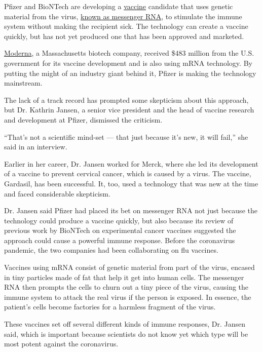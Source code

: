 Pfizer and BioNTech are developing a
\href{https://www.nytimes3xbfgragh.onion/2020/05/15/us/politics/coronavirus-vaccine-timeline.html}{vaccine}
candidate that uses genetic material from the virus,
\href{https://www.nytimes3xbfgragh.onion/2020/05/05/health/pfizer-vaccine-coronavirus.html}{known
as messenger RNA}, to stimulate the immune system without making the
recipient sick. The technology can create a vaccine quickly, but has not
yet produced one that has been approved and marketed.

\href{https://www.nytimes3xbfgragh.onion/2020/07/27/health/moderna-vaccine-covid.html}{Moderna},
a Massachusetts biotech company, received \$483 million from the U.S.
government for its vaccine development and is also using mRNA
technology. By putting the might of an industry giant behind it, Pfizer
is making the technology mainstream.

The lack of a track record has prompted some skepticism about this
approach, but Dr. Kathrin Jansen, a senior vice president and the head
of vaccine research and development at Pfizer, dismissed the criticism.

``That's not a scientific mind-set --- that just because it's new, it
will fail,'' she said in an interview.

Earlier in her career, Dr. Jansen worked for Merck, where she led its
development of a vaccine to prevent cervical cancer, which is caused by
a virus. The vaccine, Gardasil, has been successful. It, too, used a
technology that was new at the time and faced considerable skepticism.

Dr. Jansen said Pfizer had placed its bet on messenger RNA not just
because the technology could produce a vaccine quickly, but also because
its review of previous work by BioNTech on experimental cancer vaccines
suggested the approach could cause a powerful immune response. Before
the coronavirus pandemic, the two companies had been collaborating on
flu vaccines.

Vaccines using mRNA consist of genetic material from part of the virus,
encased in tiny particles made of fat that help it get into human cells.
The messenger RNA then prompts the cells to churn out a tiny piece of
the virus, causing the immune system to attack the real virus if the
person is exposed. In essence, the patient's cells become factories for
a harmless fragment of the virus.

These vaccines set off several different kinds of immune responses, Dr.
Jansen said, which is important because scientists do not know yet which
type will be most potent against the coronavirus.


